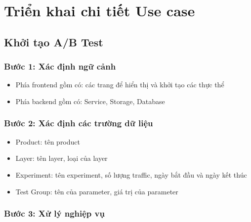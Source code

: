 

\section{Triển khai chi tiết Use case}

\subsection{Khởi tạo A/B Test}

\subsubsection{Bước 1: Xác định ngữ cảnh}

\begin{itemize}
	\item Phía frontend gồm có: các trang để hiển thị và khởi tạo các thực thể
	\item Phía backend gồm có: Service, Storage, Database
\end{itemize}

\subsubsection{Bước 2: Xác định các trường dữ liệu}

\begin{itemize}
	\item Product: tên product
	\item Layer: tên layer, loại của layer
	\item Experiment: tên experiment, số lượng traffic, ngày bắt đầu và ngày kết thúc
	\item Test Group: tên của parameter, giá trị của parameter
\end{itemize}

\subsubsection{Bước 3: Xử lý nghiệp vụ}

